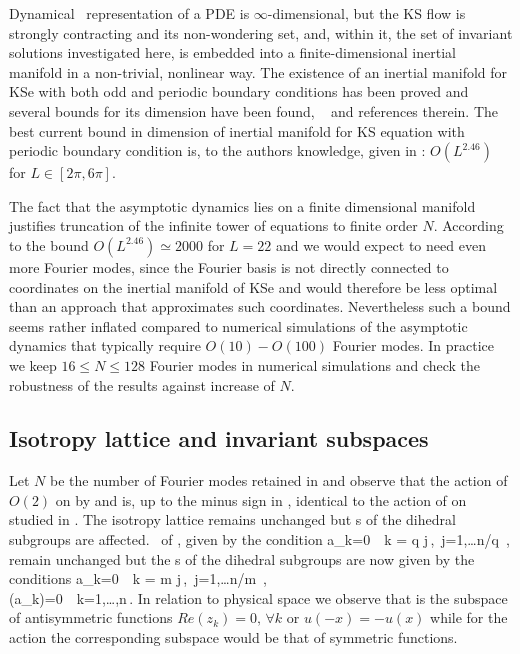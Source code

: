 Dynamical \statesp\ representation of a PDE is $\infty$-dimensional,
but the KS flow is strongly contracting and its non-wondering set,
and, within it, the set of invariant solutions investigated here, is
embedded into a finite-dimensional inertial manifold in
a non-trivial, nonlinear way. The existence of an inertial manifold for
KSe with both odd and periodic boundary conditions has been proved and
several bounds for its dimension have been found, \cf\  and references
therein. The best current bound in dimension of inertial manifold for KS
equation with periodic boundary condition is, to the authors knowledge,
given in : $O(L^{2.46})$ for $L\in[2\pi,6\pi]$.

The fact that the asymptotic dynamics lies on a finite dimensional manifold
justifies truncation of the infinite tower of equations  to finite
order $N$. According to the bound $O(L^{2.46})\simeq2000$ for $L=22$ and 
we would expect to need even more Fourier modes, since the Fourier basis
is not directly connected to coordinates on the inertial manifold of KSe and would therefore
be less optimal than an approach that approximates such coordinates\cite[for example]{Jolly_approximate_1990,jolly_accurate_2001}.
Nevertheless such a bound seems rather inflated compared to numerical simulations
of the asymptotic dynamics that typically require $O(10)-O(100)$ Fourier modes. 
In practice we keep $16\leq N \leq 128$ Fourier modes in numerical simulations 
and check the robustness of the results against increase of $N$.

\subsection{Isotropy lattice and invariant subspaces}
\label{ksIso}

Let $N$ be the number of Fourier modes retained in 
and observe that the action of $O(2)$ 
on  by  and  is,
up to the minus sign in , identical
to the action  of  on  studied
in . 
The isotropy lattice remains unchanged but \fixedsp s of the dihedral subgroups are affected. 
\Fixedsp\ of , given by the condition
\beq
	a_k=0\ \ k = q j\,,\ j=1,\ldots\lfloor n/q \rfloor\,,
	\label{eq:O2CqFix}
\eeq
remain unchanged but the \fixedsp s of the dihedral subgroups  are now given by the conditions
\bea
	a_k=0\ \ k = m j\,,\ j=1,\ldots\lfloor n/m \rfloor\,, \\
	\Re(a_k)=0\ \ k=1,\ldots,n\,.
	\label{eq:O2ksDqFix}
\eea
In relation to physical space we observe that  is the subspace of antisymmetric functions $Re(z_k)=0,\, \forall k$ or $u(-x)=-u(x)$ while for the action  the corresponding
subspace would be that of symmetric functions.

